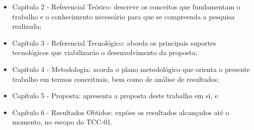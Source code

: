 \begin{itemize}


        \item Capítulo 2 - Referencial Teórico: descreve os conceitos que fundamentam o trabalho e o conhecimento necessário para que se compreenda a pesquisa realizada;
        
        \item Capítulo 3 - Referencial Tecnológico: aborda os principais suportes tecnológicos que viabilizarão o desenvolvimento da proposta;
        
        \item Capítulo 4 - Metodologia: acorda o plano metodológico que orienta o presente trabalho em termos conceituais, bem como de análise de resultados;

        \item Capítulo 5 - Proposta: apresenta a proposta deste trabalho em si, e

        \item Capítulo 6 - Resultados Obtidos: expões os resultados alcançados até o momento, no escopo do TCC-01.
          
\end{itemize}
